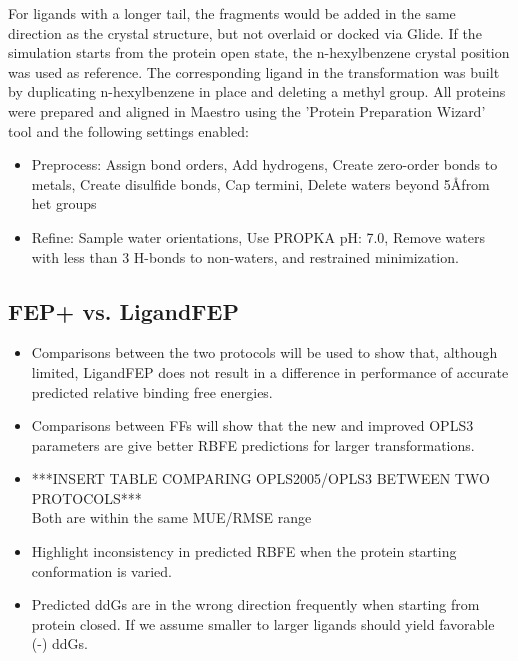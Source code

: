 \documentclass{article}
\begin{document}
For ligands with a longer tail, the fragments would be added in the same direction as the crystal structure, but not overlaid or docked via Glide.
If the simulation starts from the protein open state, the n-hexylbenzene crystal position was used as reference.
The corresponding ligand in the transformation was built by duplicating n-hexylbenzene in place and deleting a methyl group.
All proteins were prepared and aligned in Maestro using the 'Protein Preparation Wizard' tool and the following settings enabled:
   \begin{itemize}
   \item Preprocess: Assign bond orders, Add hydrogens, Create zero-order bonds to metals, Create disulfide bonds, Cap termini, Delete waters beyond 5\AA from het groups
   \item Refine: Sample water orientations, Use PROPKA pH: 7.0, Remove waters with less than 3 H-bonds to non-waters, and restrained minimization.
   \end{itemize}

\subsection{FEP+ vs. LigandFEP}
   \begin{itemize}
   \item Comparisons between the two protocols will be used to show that, although limited, LigandFEP does not result in a difference in performance of accurate predicted relative binding free energies.
   \item Comparisons between FFs will show that the new and improved OPLS3 parameters are give better RBFE predictions for larger transformations.
   \item ***INSERT TABLE COMPARING OPLS2005/OPLS3 BETWEEN TWO PROTOCOLS***
      \\ Both are within the same MUE/RMSE range
   \item Highlight inconsistency in predicted RBFE when the protein starting conformation is varied.
   \item Predicted ddGs are in the wrong direction frequently when starting from protein closed. 
      If we assume smaller to larger ligands should yield favorable (-) ddGs.
   \end{itemize}
\end{document}
